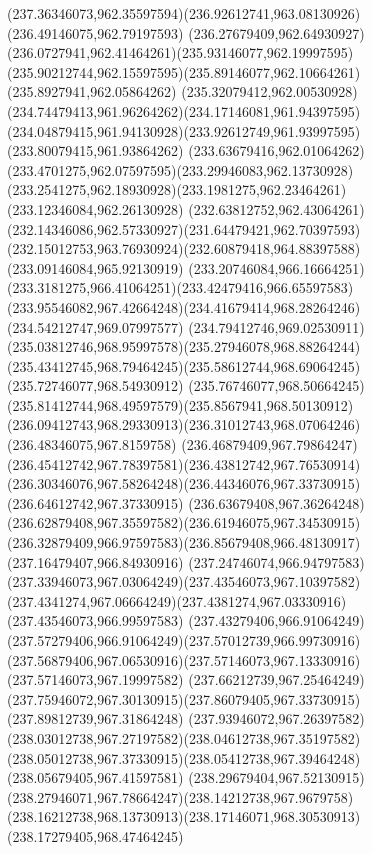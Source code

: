 {    \curveto(237.36346073,962.35597594)(236.92612741,963.08130926)(236.49146075,962.79197593)
    \curveto(236.27679409,962.64930927)(236.0727941,962.41464261)(235.93146077,962.19997595)
    \curveto(235.90212744,962.15597595)(235.89146077,962.10664261)(235.8927941,962.05864262)
    \curveto(235.32079412,962.00530928)(234.74479413,961.96264262)(234.17146081,961.94397595)
    \curveto(234.04879415,961.94130928)(233.92612749,961.93997595)(233.80079415,961.93864262)
    \curveto(233.63679416,962.01064262)(233.4701275,962.07597595)(233.29946083,962.13730928)
    \curveto(233.2541275,962.18930928)(233.1981275,962.23464261)(233.12346084,962.26130928)
    \curveto(232.63812752,962.43064261)(232.14346086,962.57330927)(231.64479421,962.70397593)
    \curveto(232.15012753,963.76930924)(232.60879418,964.88397588)(233.09146084,965.92130919)
    \curveto(233.20746084,966.16664251)(233.3181275,966.41064251)(233.42479416,966.65597583)
    \curveto(233.95546082,967.42664248)(234.41679414,968.28264246)(234.54212747,969.07997577)
    \curveto(234.79412746,969.02530911)(235.03812746,968.95997578)(235.27946078,968.88264244)
    \curveto(235.43412745,968.79464245)(235.58612744,968.69064245)(235.72746077,968.54930912)
    \curveto(235.76746077,968.50664245)(235.81412744,968.49597579)(235.8567941,968.50130912)
    \curveto(236.09412743,968.29330913)(236.31012743,968.07064246)(236.48346075,967.8159758)
    \curveto(236.46879409,967.79864247)(236.45412742,967.78397581)(236.43812742,967.76530914)
    \curveto(236.30346076,967.58264248)(236.44346076,967.33730915)(236.64612742,967.37330915)
    \curveto(236.63679408,967.36264248)(236.62879408,967.35597582)(236.61946075,967.34530915)
    \curveto(236.32879409,966.97597583)(236.85679408,966.48130917)(237.16479407,966.84930916)
    \curveto(237.24746074,966.94797583)(237.33946073,967.03064249)(237.43546073,967.10397582)
    \curveto(237.4341274,967.06664249)(237.4381274,967.03330916)(237.43546073,966.99597583)
    \curveto(237.43279406,966.91064249)(237.57279406,966.91064249)(237.57012739,966.99730916)
    \curveto(237.56879406,967.06530916)(237.57146073,967.13330916)(237.57146073,967.19997582)
    \curveto(237.66212739,967.25464249)(237.75946072,967.30130915)(237.86079405,967.33730915)
    \lineto(237.89812739,967.31864248)
    \curveto(237.93946072,967.26397582)(238.03012738,967.27197582)(238.04612738,967.35197582)
    \curveto(238.05012738,967.37330915)(238.05412738,967.39464248)(238.05679405,967.41597581)
    \curveto(238.29679404,967.52130915)(238.27946071,967.78664247)(238.14212738,967.9679758)
    \curveto(238.16212738,968.13730913)(238.17146071,968.30530913)(238.17279405,968.47464245)
}
